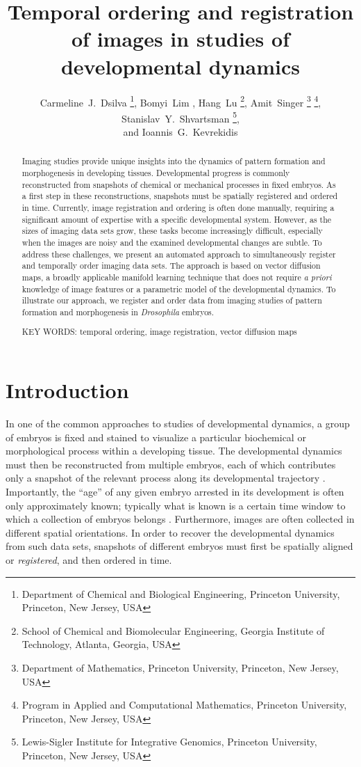 \documentclass[twocolumn, 10pt]{article}
\title{Temporal ordering and registration of images in studies of developmental dynamics}
\author{Carmeline~J.~Dsilva \thanks{Department of Chemical and Biological Engineering, Princeton University, Princeton, New Jersey, USA},
Bomyi~Lim \footnotemark[1],
Hang~Lu \thanks{School of Chemical and Biomolecular Engineering, Georgia Institute of Technology, Atlanta, Georgia, USA},
Amit~Singer \thanks{Department of Mathematics, Princeton University, Princeton, New Jersey, USA} \thanks{Program in Applied and Computational Mathematics, Princeton University, Princeton, New Jersey, USA},
Stanislav~Y.~Shvartsman \footnotemark[1] \thanks{Lewis-Sigler Institute for Integrative Genomics, Princeton University, Princeton, New Jersey, USA}, \\
and Ioannis~G.~Kevrekidis \footnotemark[1] \footnotemark[4]}
\date{}
\begin{document}
\maketitle

\begin{abstract}

Imaging studies provide unique insights into the dynamics of pattern formation and morphogenesis in developing tissues.
%
Developmental progress is commonly reconstructed from snapshots of chemical or mechanical processes in fixed embryos.
%
As a first step in these reconstructions, snapshots must be spatially registered and ordered in time.
%
Currently, image registration and ordering is often done manually, requiring a significant amount of expertise with a specific developmental system.
%
However, as the sizes of imaging data sets grow, these tasks become increasingly difficult, especially when the images are noisy and the examined developmental changes are subtle.
%
To address these challenges, we present an automated approach to simultaneously register and temporally order imaging data sets.
%
The approach is based on vector diffusion maps, a broadly applicable manifold learning technique that does not require \textit{a priori} knowledge of image features or a parametric model of the developmental dynamics.
%
To illustrate our approach, we register and order data from imaging studies of pattern formation and morphogenesis in  \textit{Drosophila} embryos.

\vspace{1em}

\noindent
KEY WORDS: temporal ordering, image registration, vector diffusion maps

\end{abstract}



\section*{Introduction}

In one of the common approaches to studies of developmental dynamics, a group of embryos is fixed and stained to visualize a particular biochemical or morphological process within a developing tissue. 
%
The developmental dynamics must then be reconstructed from multiple embryos, each of which contributes only a snapshot of the relevant process along its developmental trajectory \citep{jaeger2004dynamic, peter2011gene, fowlkes2008quantitative}.
%
Importantly, the ``age'' of any given embryo arrested in its development is often only approximately known; typically what is known is
a certain time window to which a collection of embryos belongs \citep{ng2012large, richardson2014emage, castro2009automatic}.
%
Furthermore, images are often collected in different spatial orientations.
%
In order to recover the developmental dynamics from such data sets, snapshots of different embryos must first be spatially aligned or {\em registered}, and then ordered in time.
%
\end{document}
